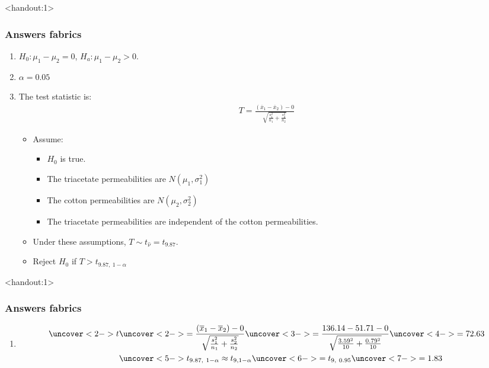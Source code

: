 \documentclass[handout]{beamer}\usepackage[]{graphicx}\usepackage[]{color}
\newcommand{\answers}{1}
\providecommand{\ov}[1]{\overline{#1}}
\providecommand{\wh}[1]{\widehat{#1}}
\numberwithin{equation}{section}
\begin{document}
\begin{frame}<handout:\answers>
\frametitle{Answers fabrics}
\begin{enumerate}[1. ]
\item $H_0:  \mu_1 - \mu_2 = 0$, $H_a: \mu_1 - \mu_2 > 0$.
\pause \item $\alpha = 0.05$
\pause \item The test statistic is:
\pause \begin{align*}
T = \frac{(\ov{x}_1 - \ov{x}_2) - 0}{ \sqrt{\frac{s_1^2}{n_1} + \frac{s_2^2}{n_2}}} 
\end{align*}
\begin{itemize}
\pause \item Assume:
\begin{itemize}
\pause \item $H_0$ is true.
\pause \item The triacetate permeabilities are $N(\mu_1, \sigma^2_1)$
\pause \item The cotton permeabilities are $N(\mu_2, \sigma^2_2)$
\pause \item The triacetate permeabilities are independent of the cotton permeabilities.
\end{itemize}
\pause \item Under these assumptions, $T \sim t_{\wh{\nu}} = t_{9.87}$.
\pause \item Reject $H_0$ if $T > t_{9.87, \ 1 - \alpha}$
\end{itemize}
\setcounter{saveenum}{\value{enumi}}

\end{enumerate}
\end{frame}

\begin{frame}<handout:\answers>
\frametitle{Answers fabrics}
\begin{enumerate}[1. ]
\setcounter{enumi}{\value{saveenum}}
\item 
\begin{align*}
\uncover<2->{t} & \uncover<2->{=  \frac{(\ov{x}_1 - \ov{x}_2) - 0}{ \sqrt{\frac{s_1^2}{n_1} + \frac{s_2^2}{n_2}}}} \uncover<3->{= \frac{136.14 - 51.71 - 0}{ \sqrt{\frac{3.59^2}{10} + \frac{0.79^2}{10}}}} \uncover<4->{ = 72.63} \\
&\uncover<5->{t_{9.87, \ 1 - \alpha} \approx  t_{9, 1- \alpha}} \uncover<6->{ = t_{9, \ 0.95}} \uncover<7->{ =  1.83} \\
\end{align*}
\end{enumerate}
\end{frame}
\end{document}
